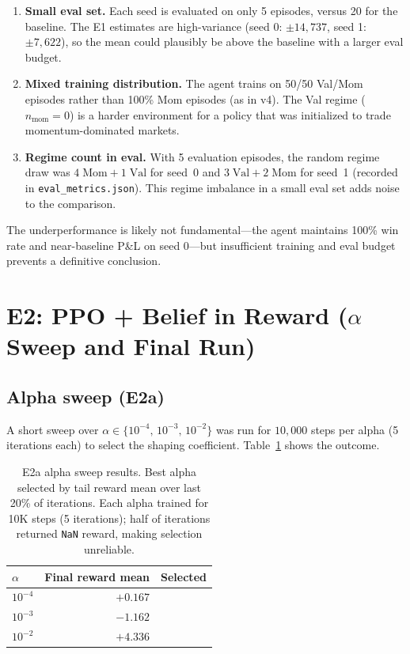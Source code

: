 \documentclass[11pt]{article}
\newcommand{\cmark}{\checkmark}
\begin{document}
\begin{enumerate}
  \item \textbf{Small eval set.} Each seed is evaluated on only 5 episodes,
        versus 20 for the baseline. The E1 estimates are high-variance
        (seed 0: $\pm14{,}737$, seed 1: $\pm7{,}622$), so the mean could
        plausibly be above the baseline with a larger eval budget.
  \item \textbf{Mixed training distribution.} The agent trains on 50/50
        Val/Mom episodes rather than 100\% Mom episodes (as in v4).
        The Val regime ($n_\text{mom}=0$) is a harder environment for a
        policy that was initialized to trade momentum-dominated markets.
  \item \textbf{Regime count in eval.} With 5 evaluation episodes, the
        random regime draw was $4\;\text{Mom} + 1\;\text{Val}$ for seed~0
        and $3\;\text{Val} + 2\;\text{Mom}$ for seed~1 (recorded in
        \texttt{eval\_metrics.json}). This regime imbalance in a small eval
        set adds noise to the comparison.
\end{enumerate}

\noindent
The underperformance is likely not fundamental---the agent maintains 100\%
win rate and near-baseline P\&L on seed 0---but insufficient training and
eval budget prevents a definitive conclusion.

\section{E2: PPO + Belief in Reward ($\alpha$ Sweep and Final Run)}

\subsection{Alpha sweep (E2a)}

A short sweep over $\alpha \in \{10^{-4},\, 10^{-3},\, 10^{-2}\}$ was run
for $10{,}000$ steps per alpha (5 iterations each) to select the shaping
coefficient. Table~\ref{tab:alphasweep} shows the outcome.

\begin{table}[H]
\centering
\begin{tabular}{lrr}
\toprule
$\alpha$ & \textbf{Final reward mean} & \textbf{Selected} \\
\midrule
$10^{-4}$ & $+0.167$ & \\
$10^{-3}$ & $-1.162$ & \\
$10^{-2}$ & $+4.336$ & \cmark \\
\bottomrule
\end{tabular}
\caption{E2a alpha sweep results. Best alpha selected by tail reward mean
         over last 20\% of iterations. Each alpha trained for 10K steps
         (5 iterations); half of iterations returned \texttt{NaN} reward,
         making selection unreliable.}
\label{tab:alphasweep}
\end{table}
\end{document}
